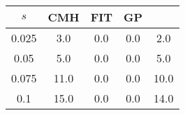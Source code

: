 \centering \begin{tabular}{c|c|c|c|c}
$s$	&CMH	&FIT	&GP	&\sc{Clear}\\\hline
0.025	&3.0	&0.0	&0.0	&2.0\\
0.05	&5.0	&0.0	&0.0	&5.0\\
0.075	&11.0	&0.0	&0.0	&10.0\\
0.1	&15.0	&0.0	&0.0	&14.0\\
\end{tabular}
